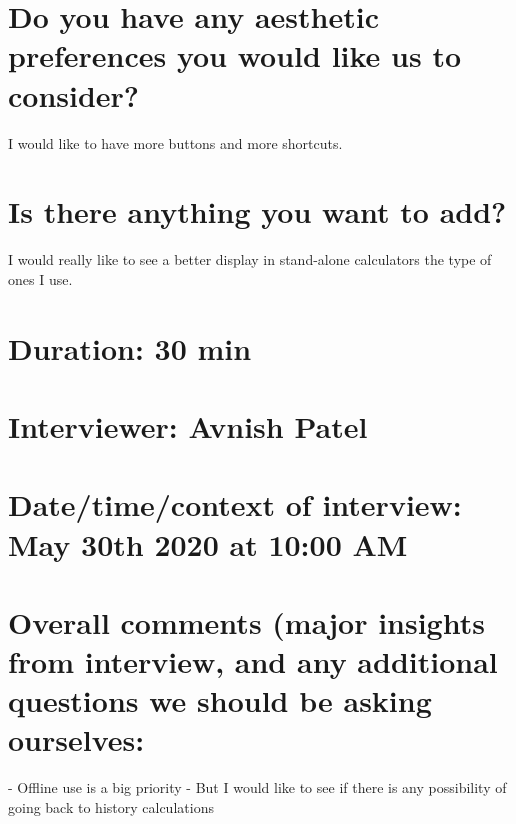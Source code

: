 \documentclass{article}
\begin{document}
\section*{\large{Do you have any aesthetic preferences you would like us to consider?}}
I would like to have more buttons and more shortcuts.

\section*{\large{Is there anything you want to add?}}
I would really like to see a better display in stand-alone calculators the type of ones I use.


\bigskip
\bigskip
\bigskip


\section*{\large{Duration:} 30 min}
\section*{\large{Interviewer:} Avnish Patel}
\section*{\large{Date/time/context of interview:} May 30th 2020 at 10:00 AM}

\bigskip
\bigskip

\section*{\large Overall comments (major insights from interview, and any additional questions we should be
asking ourselves:}
- Offline use is a big priority - But I would like to see if there is any possibility of going back to
history calculations
\end{document}
